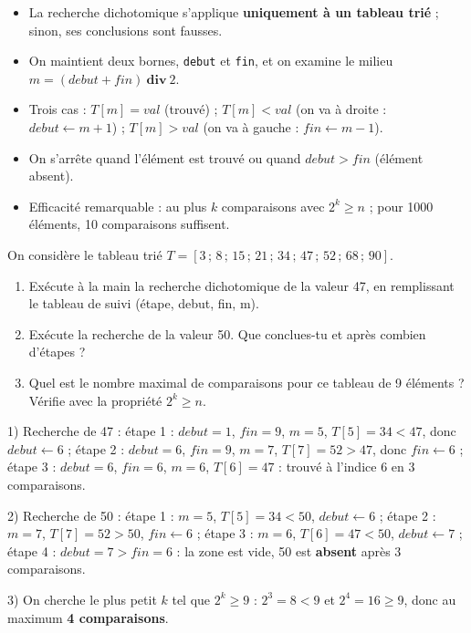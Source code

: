 \documentclass[11pt]{article}
\begin{document}
\begin{aretenir}
\begin{itemize}
  \item La recherche dichotomique s'applique \textbf{uniquement à un tableau trié} ; sinon, ses conclusions sont fausses.
  \item On maintient deux bornes, \texttt{debut} et \texttt{fin}, et on examine le milieu $m = (debut + fin)\ \textbf{div}\ 2$.
  \item Trois cas : $T[m] = val$ (trouvé) ; $T[m] < val$ (on va à droite : $debut \leftarrow m+1$) ; $T[m] > val$ (on va à gauche : $fin \leftarrow m-1$).
  \item On s'arrête quand l'élément est trouvé ou quand $debut > fin$ (élément absent).
  \item Efficacité remarquable : au plus $k$ comparaisons avec $2^k \geq n$ ; pour 1000 éléments, 10 comparaisons suffisent.
\end{itemize}
\end{aretenir}

\begin{exercice}
On considère le tableau trié $T = [3\,;\,8\,;\,15\,;\,21\,;\,34\,;\,47\,;\,52\,;\,68\,;\,90]$.
\begin{enumerate}
  \item Exécute à la main la recherche dichotomique de la valeur 47, en remplissant le tableau de suivi (étape, debut, fin, m).
  \item Exécute la recherche de la valeur 50. Que conclues-tu et après combien d'étapes ?
  \item Quel est le nombre maximal de comparaisons pour ce tableau de 9 éléments ? Vérifie avec la propriété $2^k \geq n$.
\end{enumerate}
\end{exercice}

\begin{corrige}
1) Recherche de 47 : étape 1 : $debut=1$, $fin=9$, $m=5$, $T[5]=34 < 47$, donc $debut \leftarrow 6$ ; étape 2 : $debut=6$, $fin=9$, $m=7$, $T[7]=52 > 47$, donc $fin \leftarrow 6$ ; étape 3 : $debut=6$, $fin=6$, $m=6$, $T[6]=47$ : trouvé à l'indice 6 en 3 comparaisons.

2) Recherche de 50 : étape 1 : $m=5$, $T[5]=34 < 50$, $debut \leftarrow 6$ ; étape 2 : $m=7$, $T[7]=52 > 50$, $fin \leftarrow 6$ ; étape 3 : $m=6$, $T[6]=47 < 50$, $debut \leftarrow 7$ ; étape 4 : $debut=7 > fin=6$ : la zone est vide, 50 est \textbf{absent} après 3 comparaisons.

3) On cherche le plus petit $k$ tel que $2^k \geq 9$ : $2^3 = 8 < 9$ et $2^4 = 16 \geq 9$, donc au maximum \textbf{4 comparaisons}.
\end{corrige}
\end{document}
